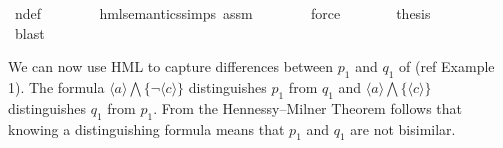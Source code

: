 \begin{isabellebody}
\ n{\isasymphi}{\isacharunderscore}{\kern0pt}def\isanewline
\ \ \ \ \ \ \isamarkupfalse%
\ hml{\isacharunderscore}{\kern0pt}semantics{\isachardot}{\kern0pt}simps\ assm\isanewline
\ \ \ \ \ \ \isamarkupfalse%
\ force\isanewline
\ \ \ \ \isamarkupfalse%
\ \isamarkupfalse%
\ {\isacharquery}{\kern0pt}thesis\isanewline
\ \ \ \ \ \ \isamarkupfalse%
\ blast\isanewline
\ \ \isamarkupfalse%
\isanewline
{}\isamarkupfalse%
%
\endisatagproof
{\isafoldproof}%
%
\isadelimproof
%
\endisadelimproof
%
\begin{isamarkuptext}%
We can now use HML to capture differences between $p_1$ and $q_1$ of (ref Example 1). The formula
$\langle a \rangle\bigwedge\{\lnot\langle c \rangle\}$ distinguishes $p_1$ from $q_1$ and $\langle a \rangle\bigwedge\{\langle c \rangle\}$ distinguishes
$q_1$ from $p_1$. From the Hennessy--Milner Theorem follows that knowing a distinguishing formula means that $p_1$ and $q_1$ are not bisimilar.%
\end{isamarkuptext}\isamarkuptrue%
%
\isadelimproof
%
\endisadelimproof
%
\isatagproof
%
\endisatagproof
{\isafoldproof}%
%
\isadelimproof
%
\endisadelimproof
%
\isadelimdocument
%
\endisadelimdocument
%
\isatagdocument
%
\endisatagdocument
{\isafolddocument}%
%
\isadelimdocument
%
\endisadelimdocument
%
\isadelimproof
%
\endisadelimproof
%
\isatagproof
%
\endisatagproof
{\isafoldproof}%
%
\isadelimproof
\isanewline
%
\endisadelimproof
{}\isamarkupfalse%
\ \isanewline
%
\isadelimtheory
%
\endisadelimtheory
%
\isatagtheory
%
\endisatagtheory
{\isafoldtheory}%
%
\isadelimtheory
%
\endisadelimtheory
%
\end{isabellebody}%
\endinput
